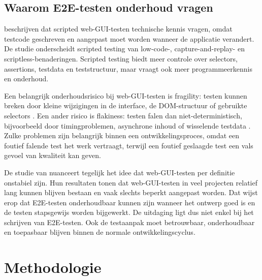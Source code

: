 \subsection{Waarom E2E-testen onderhoud vragen}

\textcite{DiMeglio2026} beschrijven dat scripted web-GUI-testen technische kennis vragen, omdat testcode geschreven en aangepast moet worden wanneer de applicatie verandert. De studie onderscheidt scripted testing van low-code-, capture-and-replay- en scriptless-benaderingen. Scripted testing biedt meer controle over selectors, assertions, testdata en teststructuur, maar vraagt ook meer programmeerkennis en onderhoud.

Een belangrijk onderhoudsrisico bij web-GUI-testen is fragility: testen kunnen breken door kleine wijzigingen in de interface, de DOM-structuur of gebruikte selectors \autocite{DiMeglio2026}. Een ander risico is flakiness: testen falen dan niet-deterministisch, bijvoorbeeld door timingproblemen, asynchrone inhoud of wisselende testdata \autocite{DiMeglio2026}. Zulke problemen zijn belangrijk binnen een ontwikkelingsproces, omdat een foutief falende test het werk vertraagt, terwijl een foutief geslaagde test een vals gevoel van kwaliteit kan geven.

De studie van \textcite{DiMeglio2026} nuanceert tegelijk het idee dat web-GUI-testen per definitie onstabiel zijn. Hun resultaten tonen dat web-GUI-testen in veel projecten relatief lang kunnen blijven bestaan en vaak slechts beperkt aangepast worden. Dat wijst erop dat E2E-testen onderhoudbaar kunnen zijn wanneer het ontwerp goed is en de testen stapsgewijs worden bijgewerkt. De uitdaging ligt dus niet enkel bij het schrijven van E2E-testen. Ook de testaanpak moet betrouwbaar, onderhoudbaar en toepasbaar blijven binnen de normale ontwikkelingscyclus.





\section{Methodologie}%
\label{sec:methodologie}

